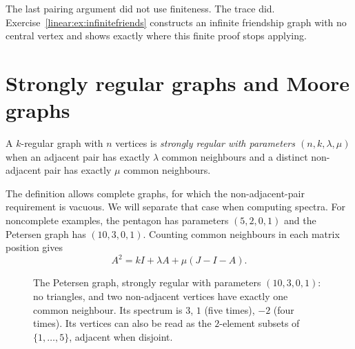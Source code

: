 The last pairing argument did not use finiteness. The trace did. Exercise~\ref{linear:ex:infinitefriends} constructs an infinite friendship graph with no central vertex and shows exactly where this finite proof stops applying.

\section{Strongly regular graphs and Moore graphs}

\begin{definition}\label{linear:def:srg}
A $k$-regular graph with $n$ vertices is \emph{strongly regular with parameters $(n,k,\lambda,\mu)$} when an adjacent pair has exactly $\lambda$ common neighbours and a distinct non-adjacent pair has exactly $\mu$ common neighbours.
\end{definition}

The definition allows complete graphs, for which the non-adjacent-pair requirement is vacuous. We will separate that case when computing spectra. For noncomplete examples, the pentagon has parameters $(5,2,0,1)$ and the Petersen graph has $(10,3,0,1)$. Counting common neighbours in each matrix position gives
\begin{equation}\label{linear:eq:srg}
A^2=kI+\lambda A+\mu(J-I-A).
\end{equation}

\begin{figure}[ht]
\centering
{}
\caption{The Petersen graph, strongly regular with parameters $(10,3,0,1)$: no triangles, and two non-adjacent vertices have
exactly one common neighbour. Its spectrum is $3$, $1$ (five times), $-2$ (four times). Its vertices can also be read as the
$2$-element subsets of $\{1,\dots,5\}$, adjacent when disjoint.}
\label{linear:fig:petersen}
\end{figure}

